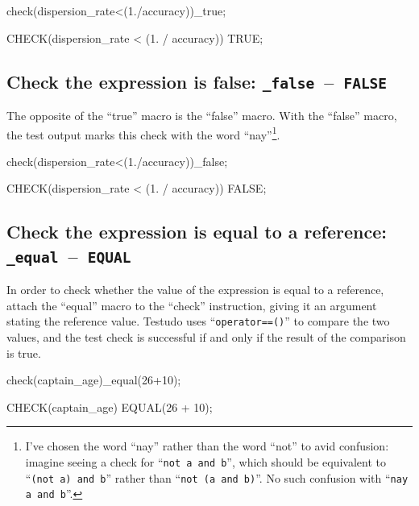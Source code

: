 \documentclass[twoside, a4paper, article]{memoir}
\newcommand*\testudocolor{\color{red!80!blue}}
\newcommand*\testudo[1]{\texttt{\testudocolor{}#1}}
\newcommand*\testudopair[2]{\testudo{#1}~--~\testudo{#2}}
\begin{document}
\begin{cpplisting}
check(dispersion_rate<(1./accuracy))_true;
\end{cpplisting}

\begin{cpplisting}
CHECK(dispersion_rate < (1. / accuracy)) TRUE;
\end{cpplisting}

\subsection{Check the expression is false:
  \testudopair{\_false}{FALSE}}
\label{sec:check-expression-true}

The opposite of the ``true'' macro is the ``false'' macro.  With the ``false''
macro, the test output marks this check with the word ``nay''\footnote{I've
  chosen the word ``nay'' rather than the word ``not'' to avid confusion:
  imagine seeing a check for ``\texttt{not a and b}'', which should be
  equivalent to ``\texttt{(not a) and b}'' rather than ``\texttt{not (a and
    b)}''.  No such confusion with ``\texttt{nay a and b}''.}.

\begin{cpplisting}
check(dispersion_rate<(1./accuracy))_false;
\end{cpplisting}

\begin{cpplisting}
CHECK(dispersion_rate < (1. / accuracy)) FALSE;
\end{cpplisting}

\subsection{Check the expression is equal to a reference:
  \testudopair{\_equal}{EQUAL}}
\label{sec:check-expression-equal-reference}

In order to check whether the value of the expression is equal to a reference,
attach the ``equal'' macro to the ``check'' instruction, giving it an argument
stating the reference value.  Testudo uses ``\texttt{operator==()}'' to
compare the two values, and the test check is successful if and only if the
result of the comparison is true.

\begin{cpplisting}
check(captain_age)_equal(26+10);
\end{cpplisting}

\begin{cpplisting}
CHECK(captain_age) EQUAL(26 + 10);
\end{cpplisting}
\end{document}
